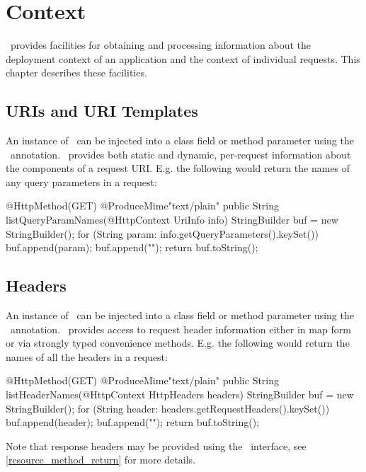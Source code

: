 \chapter{Context}
\label{context}

\jaxrs\ provides facilities for obtaining and processing information about the deployment context of an application and the context of individual requests. This chapter describes these facilities.

\section{URIs and URI Templates}

An instance of \UriInfo\ can be injected into a class field or method parameter using the \HttpContext\ annotation. \UriInfo\ provides both static and dynamic, per-request information about the components of a request URI. E.g. the following would return the names of any query parameters in a request:

\begin{listing}{1}
@HttpMethod(GET)
@ProduceMime{"text/plain"}
public String listQueryParamNames(@HttpContext UriInfo info) {
  StringBuilder buf = new StringBuilder();
  for (String param: info.getQueryParameters().keySet()) {
    buf.append(param);
    buf.append("\n");
  }
  return buf.toString();
}
\end{listing}

\section{Headers}

An instance of \HttpHeaders\ can be injected into a class field or method parameter using the \HttpContext\ annotation. \HttpHeaders\ provides access to request header information either in map form or via strongly typed convenience methods. E.g. the following would return the names of all the headers in a request:

\begin{listing}{1}
@HttpMethod(GET)
@ProduceMime{"text/plain"}
public String listHeaderNames(@HttpContext HttpHeaders headers) {
  StringBuilder buf = new StringBuilder();
  for (String header: headers.getRequestHeaders().keySet()) {
    buf.append(header);
    buf.append("\n");
  }
  return buf.toString();
}
\end{listing}

Note that response headers may be provided using the \Response\ interface, see \ref{resource_method_return} for more details.

